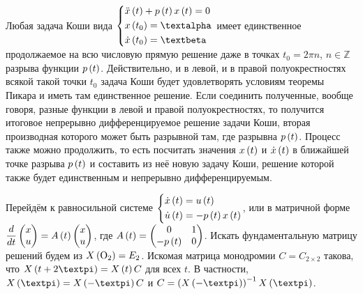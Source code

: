 \documentclass[a5paper,10pt]{article}
\begin{document}
Любая задача Коши вида 
$\tsys{& \ddot {x}\br{t} + p\br{t} x\br{t} = 0
\\& x\br{t_{0}} = \alpha
\\& \dot{x}\br{t_{0}} = \beta}$
имеет единственное продолжаемое на всю числовую прямую решение даже в точках $t_{0} = 2\pi n$, $n \in \mathbb{Z}$ разрыва функции $p\left(t\right)$. Действительно, и в левой, и в правой полуокрестностях всякой такой точки $t_{0}$ задача Коши будет удовлетворять условиям теоремы Пикара и иметь там единственное решение. Если соединить полученные, вообще говоря, разные функции в левой и правой полуокрестностях, то получится итоговое непрерывно дифференцируемое решение задачи Коши, вторая производная которого может быть разрывной там, где разрывна $p\left(t\right)$. Процесс также можно продолжить, то есть посчитать значения $x\left(t\right)$ и $\dot{x}\left(t\right)$ в ближайшей точке разрыва $p\left(t\right)$ и составить из неё новую задачу Коши, решение которой также будет единственным и непрерывно дифференцируемым.

Перейдём к равносильной системе $\left\{ \begin{aligned}& \dot{x}\left(t\right) = u\left(t\right) \\& \dot{u}\left(t\right) = -p\left(t\right) x\left(t\right)\end{aligned} \right.$, или в матричной форме 
$\dfrac {d} {dt}
\begin{pmatrix} x \\ u \end{pmatrix}
\linebreak = A\br{t}
\begin{pmatrix} x \\ u \end{pmatrix}$, где 
$A\left(t\right) = \begin{pmatrix}0 & 1 \\ -p\left(t\right) & 0 \end{pmatrix}$. Искать фундаментальную матрицу решений будем из $X\left(\text{O}_{2}\right) = E_{2}$. Искомая матрица монодромии $C = C_{2 \times 2}$ такова, что 
$X\br{t + 2\pi} = X\br{t} C$ для всех $t$. В частности, $X\br{\pi} = X\br{-\pi} C$ и $C = \br{X\br{-\pi}}^{-1} X\br{\pi}$.
\end{document}
